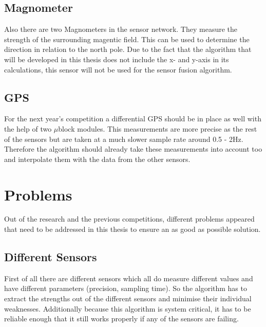  \subsection{Magnometer}
 Also there are two Magnometers in the sensor network. They measure the strength of the surrounding magentic field.
 This can be used to determine the direction in relation to the north pole.
 Due to the fact that the algorithm that will be developed in this thesis does not include the x- and y-axis in its calculations,
 this sensor will not be used for the sensor fusion algorithm.

 \subsection{GPS}
 For the next year's competition a differential GPS should be in place as well with the help of two $\mu$block modules.
 This measurements are more precise as the rest of the sensors but are taken at a much slower sample rate around 0.5 - 2Hz.
 Therefore the algorithm should already take these measurements into account too and interpolate them with the data from the other sensors.

 \section{Problems}
 Out of the research and the previous competitions, different problems appeared that need to be addressed in this thesis to ensure an as good as possible solution.

 \subsection{Different Sensors}
 First of all there are different sensors which all do measure different values and have different parameters (precision, sampling time).
 So the algorithm has to extract the strengths out of the different sensors and minimise their individual weaknesses.
 Additionally because this algorithm is system critical, it has to be reliable enough that it still works properly if any of the sensors are failing.


